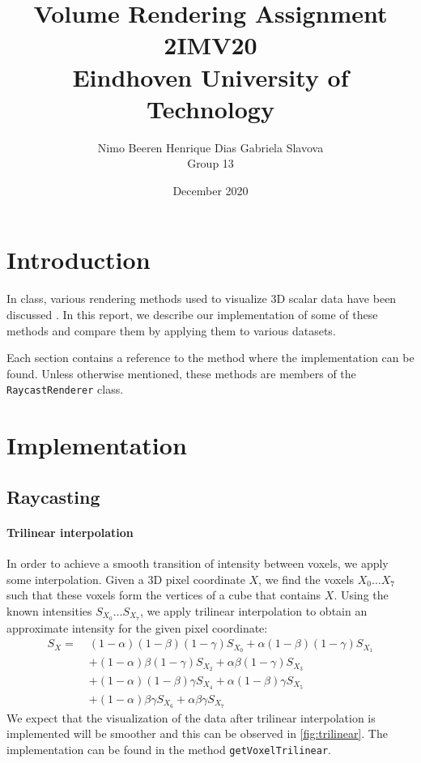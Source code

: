 \documentclass[a4paper]{article}
\title{Volume Rendering Assignment\\2IMV20\\Eindhoven University of Technology}
\author{Nimo Beeren \quad Henrique Dias \quad Gabriela Slavova\\Group 13}
\date{December 2020}
\begin{document}
\maketitle

\section{Introduction}

In class, various rendering methods used to visualize 3D scalar data have been discussed \citep{2imv20_2}. In this report, we describe our implementation of some of these methods and compare them by applying them to various datasets.

Each section contains a reference to the method where the implementation can be found. Unless otherwise mentioned, these methods are members of the {\tt RaycastRenderer} class.

\section{Implementation}

\subsection{Raycasting}
\label{subsec:raycasting}

\paragraph{Trilinear interpolation}

In order to achieve a smooth transition of intensity between voxels, we apply some interpolation. Given a 3D pixel coordinate $X$, we find the voxels $X_0 \ldots X_7$ such that these voxels form the vertices of a cube that contains $X$. Using the known intensities $S_{X_0}\ldots S_{X_7}$, we apply trilinear interpolation to obtain an approximate intensity for the given pixel coordinate:
\begin{align*}
  S_X =\;&(1 - \alpha) (1 - \beta) (1 - \gamma) S_{X_0}
    + \alpha (1 - \beta) (1 - \gamma) S_{X_1}\\
    &+ (1 - \alpha) \beta (1 - \gamma) S_{X_2}
    + \alpha \beta (1 - \gamma) S_{X_3}\\
    &+ (1 - \alpha) (1 - \beta) \gamma S_{X_4}
    + \alpha (1 - \beta) \gamma S_{X_5}\\
    &+ (1 - \alpha) \beta \gamma S_{X_6}
    + \alpha \beta \gamma S_{X_7}
\end{align*}
We expect that the visualization of the data after trilinear interpolation is implemented will be smoother and this can be observed in \autoref{fig:trilinear}. The implementation can be found in the method {\tt getVoxelTrilinear}.
\end{document}
